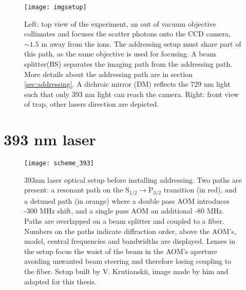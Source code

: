 \begin{figure}
\centering
\texttt{[image: imgsetup]}
\caption[Caption for LOF]{Left: top view of the experiment, an out of vacuum objective collimates and focuses the scatter photons onto the CCD camera, $\sim 1.5$ m away from the ions. The addressing setup must share part of this path, as the same objective is used for focusing.
A beam splitter\footnotemark (BS) separates the imaging path from the addressing path. More details about the addressing path are in section \ref{sec:addressing}.
A dichroic mirror (DM) reflects the 729 nm light such that only 393 nm light can reach the camera. Right: front view of trap, other lasers direction are depicted.}
\label{imgsetup}
\end{figure}

\section{393 nm laser}
\label{sec:393setup}
\begin{figure}[!ht]
\centering
\texttt{[image: scheme\_393]}
\caption{393nm laser optical setup before installing addressing. Two paths are present: a resonant path on the $\text{S}_{1/2} \to \text{P}_{3/2}$ transition (in red), and a detuned path (in orange) where a double pass AOM introduces -300 MHz shift, and a single pass AOM an additional -80 MHz. Paths are overlapped on a beam splitter and coupled to a fiber. Numbers on the paths indicate diffraction order, above the AOM's, model, central frequencies and bandwidths are displayed. Lenses in the setup focus the waist of the beam in the AOM's aperture avoiding unwanted beam steering and therefore losing coupling to the fiber. Setup built by V. Krutianskii, image made by him and adapted for this thesis.
}
\label{scheme393}
\end{figure}
